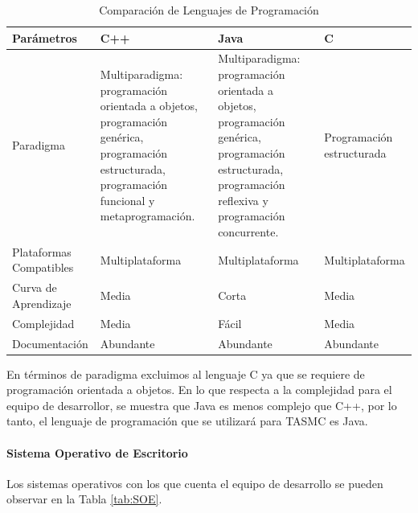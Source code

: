 \begin{table} 
	\begin{center}
		\begin{tabular}{|p{3cm}|p{3cm}|p{3cm}|p{3cm}|}
			\hline \rowcolor[RGB]{0,102,204} 
			\textcolor{blanco}{\bf Parámetros} &
				\textcolor{blanco}{\bf C++} &
				\textcolor{blanco}{\bf Java} &
				\textcolor{blanco}{\bf C} \\
			\hline \rowcolor[RGB]{224,224,224} 
				Paradigma &
				Multiparadigma: programación orientada a objetos, programación genérica, programación estructurada, programación funcional y metaprogramación. &
				Multiparadigma: programación orientada a objetos, programación genérica, programación estructurada, programación reflexiva y programación concurrente. & 
				Programación \newline estructurada \\
      		\hline 
      			Plataformas Compatibles &
				Multiplataforma &
				Multiplataforma &
				Multiplataforma \\
      		\hline \rowcolor[RGB]{224,224,224} 
      			Curva de \newline Aprendizaje &
				Media &
				Corta &
				Media \\
      		\hline 
      			Complejidad &
				Media &
				Fácil &
				Media \\
      		\hline \rowcolor[RGB]{224,224,224} 
      			Documentación &
				Abundante &
				Abundante &
				Abundante \\
      		\hline 
    		\end{tabular}
	\end{center}
	\caption[Comparación de Lenguajes de Programación]{Comparación de Lenguajes de Programación} 
	\label{tab:lenguProgra}
\end{table}

En términos de paradigma excluimos al lenguaje C ya que se requiere de programación orientada a objetos. En lo que respecta a la complejidad para el equipo de desarrollor, se muestra que Java es menos complejo que C++, por lo tanto, el lenguaje de programación que se utilizará para TASMC es Java.

\paragraph{Sistema Operativo de Escritorio}

Los sistemas operativos con los que cuenta el equipo de desarrollo se pueden observar en la Tabla \ref{tab:SOE}.

